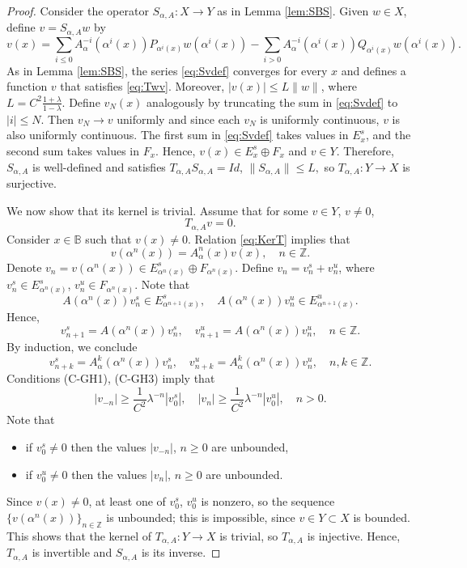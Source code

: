 \documentclass[12pt]{article}
\newcommand{\Bb}{\mathbb{B}}
\newcommand{\Zz}{\mathbb{Z}}
\theoremstyle{definition}
\begin{document}
\begin{proof}
    Consider the operator $S_{\alpha, A}:X \to Y$ as in Lemma \ref{lem:SBS}. 
    Given $w \in X$, define $v = S_{\alpha, A}w$ by
\begin{equation}\label{eq:Svdef}
v(x) = \sum_{i \leq 0} A^{-i}_{\alpha}(\alpha^i(x)) P_{\alpha^i(x)}w(\alpha^i(x)) -\sum_{i>0}A^{-i}_{\alpha}(\alpha^i(x))Q_{\alpha^i(x)}w(\alpha^i(x)).    
\end{equation}        
As in Lemma \ref{lem:SBS}, the series \eqref{eq:Svdef} converges for every $x$ and defines a function $v$ that satisfies \eqref{eq:Twv}. Moreover, $|v(x)| \leq L\|w\|$, where $L = C^2\frac{1+\lambda}{1-\lambda}$. Define $v_N(x)$ analogously by truncating the sum in \eqref{eq:Svdef} to $|i| \leq N$. Then $v_N \to v$ uniformly and since each $v_N$ is uniformly continuous, $v$ is also uniformly continuous.
The first sum in \eqref{eq:Svdef} takes values in $E_x^s$, and the second sum takes values in $F_x$. Hence, $v(x) \in E_x^s \oplus F_x$ and $v \in Y$. Therefore, $S_{\alpha, A}$ is well-defined and satisfies
$
T_{\alpha, A}S_{\alpha, A} = Id$, $\|S_{\alpha, A}\| \leq L,
$
so $T_{\alpha, A}: Y \to X$ is surjective. 

We now show that its kernel is trivial. Assume that for some $v \in Y$, $v \ne 0$, 
\begin{equation}\label{eq:KerT}
T_{\alpha, A}v = 0.    
\end{equation}
Consider $x \in \Bb$ such that $v(x) \ne 0$. Relation \eqref{eq:KerT} implies that
$$
v(\alpha^n(x)) = A^n_{\alpha}(x)v(x), \quad n \in \Zz.
$$
Denote $v_n = v(\alpha^n(x)) \in E^s_{\alpha^n(x)} \oplus F_{\alpha^n(x)}$. Define $v_n = v_n^s + v_n^u$, where $v_n^s \in E^s_{\alpha^n(x)}$, $v_n^u \in F_{\alpha^n(x)}$. Note that 
$$
A(\alpha^n(x)) v_n^s \in E_{\alpha^{n+1}(x)}^s, \quad A(\alpha^n(x)) v_n^u \in E_{\alpha^{n+1}(x)}^u.
$$
Hence,
$$
v_{n+1}^s = A(\alpha^n(x)) v_n^s, \quad v_{n+1}^u = A(\alpha^n(x)) v_n^u, \quad n \in \Zz.
$$
By induction, we conclude
$$
v_{n+k}^s = A^k_{\alpha}(\alpha^n(x)) v_n^s, \quad v_{n+k}^u = A^k_{\alpha}(\alpha^n(x)) v_n^u, \quad n, k \in \Zz.
$$
Conditions (C-GH1), (C-GH3) imply that
$$
|v_{-n}| \geq \frac{1}{C^2}\lambda^{-n} |v_{0}^s|, \quad |v_{n}| \geq \frac{1}{C^2}\lambda^{-n} |v_{0}^u|, \quad n > 0.
$$
Note that 
\begin{itemize}
    \item if $v_{0}^s \ne 0$ then the values $|v_{-n}|$, $n \geq 0$ are unbounded,
    \item if $v_{0}^u \ne 0$ then the values $|v_{n}|$, $n \geq 0$ are unbounded.
\end{itemize}
Since $v(x) \ne 0$, at least one of $v_0^s$, $v_0^u$ is nonzero, so the sequence $\{v(\alpha^n(x))\}_{n \in \Zz}$ is unbounded; this is impossible, since $v \in Y \subset X$ is bounded. This shows that the kernel of $T_{\alpha, A}: Y \to X$ is trivial, so $T_{\alpha, A}$ is injective. Hence, $T_{\alpha, A}$ is invertible and $S_{\alpha, A}$ is its inverse.   
\end{proof}
\end{document}
